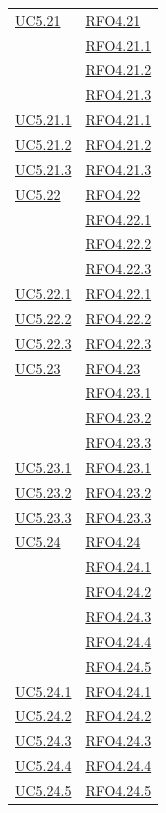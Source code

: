 \begin{longtable}{|>{\centering}m{5cm}|m{5cm}<{\centering}|}
\hyperref[UC5.21]{UC5.21} & \hyperlink{RFO4.21}{RFO4.21}\\ 
& \hyperlink{RFO4.21.1}{RFO4.21.1}\\ 
& \hyperlink{RFO4.21.2}{RFO4.21.2}\\ 
& \hyperlink{RFO4.21.3}{RFO4.21.3}\\ \hline 
\hyperref[UC5.21.1]{UC5.21.1} & \hyperlink{RFO4.21.1}{RFO4.21.1}\\\hline
\hyperref[UC5.21.2]{UC5.21.2} & \hyperlink{RFO4.21.2}{RFO4.21.2}\\\hline
\hyperref[UC5.21.3]{UC5.21.3} & \hyperlink{RFO4.21.3}{RFO4.21.3}\\\hline

\hyperref[UC5.22]{UC5.22} & \hyperlink{RFO4.22}{RFO4.22}\\ 
& \hyperlink{RFO4.22.1}{RFO4.22.1}\\ 
& \hyperlink{RFO4.22.2}{RFO4.22.2}\\ 
& \hyperlink{RFO4.22.3}{RFO4.22.3}\\ \hline 
\hyperref[UC5.22.1]{UC5.22.1} & \hyperlink{RFO4.22.1}{RFO4.22.1}\\\hline
\hyperref[UC5.22.2]{UC5.22.2} & \hyperlink{RFO4.22.2}{RFO4.22.2}\\\hline
\hyperref[UC5.22.3]{UC5.22.3} & \hyperlink{RFO4.22.3}{RFO4.22.3}\\\hline

\hyperref[UC5.23]{UC5.23} & \hyperlink{RFO4.23}{RFO4.23}\\ 
& \hyperlink{RFO4.23.1}{RFO4.23.1}\\ 
& \hyperlink{RFO4.23.2}{RFO4.23.2}\\ 
& \hyperlink{RFO4.23.3}{RFO4.23.3}\\ \hline 
\hyperref[UC5.23.1]{UC5.23.1} & \hyperlink{RFO4.23.1}{RFO4.23.1}\\\hline
\hyperref[UC5.23.2]{UC5.23.2} & \hyperlink{RFO4.23.2}{RFO4.23.2}\\\hline
\hyperref[UC5.23.3]{UC5.23.3} & \hyperlink{RFO4.23.3}{RFO4.23.3}\\\hline

\hyperref[UC5.24]{UC5.24} & \hyperlink{RFO4.24}{RFO4.24}\\ 
& \hyperlink{RFO4.24.1}{RFO4.24.1}\\ 
& \hyperlink{RFO4.24.2}{RFO4.24.2}\\ 
& \hyperlink{RFO4.24.3}{RFO4.24.3}\\ 
& \hyperlink{RFO4.24.4}{RFO4.24.4}\\ 
& \hyperlink{RFO4.24.5}{RFO4.24.5}\\ \hline
\hyperref[UC5.24.1]{UC5.24.1} & \hyperlink{RFO4.24.1}{RFO4.24.1}\\ \hline
 \hyperref[UC5.24.2]{UC5.24.2} & \hyperlink{RFO4.24.2}{RFO4.24.2}\\ \hline 
\hyperref[UC5.24.3]{UC5.24.3} & \hyperlink{RFO4.24.3}{RFO4.24.3}\\ \hline 
\hyperref[UC5.24.4]{UC5.24.4} & \hyperlink{RFO4.24.4}{RFO4.24.4}\\ \hyperref[UC5.24.5]{UC5.24.5} & \hyperlink{RFO4.24.5}{RFO4.24.5}\\ \hline


\end{longtable}
